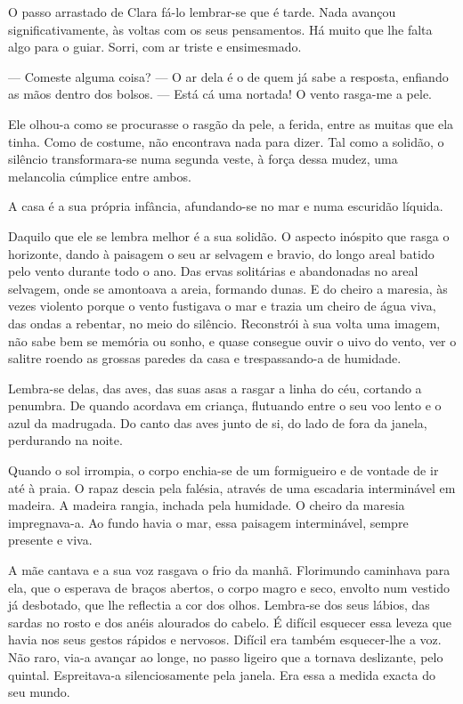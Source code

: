 O passo arrastado de Clara fá-lo lembrar-se que é tarde. Nada avançou
significativamente, às voltas com os seus pensamentos. Há muito que lhe
falta algo para o guiar. Sorri, com ar triste e ensimesmado.

--- Comeste alguma coisa? --- O ar dela é o de quem já sabe a resposta,
enfiando as mãos dentro dos bolsos. --- Está cá uma nortada! O vento
rasga-me a pele.

Ele olhou-a como se procurasse o rasgão da pele, a ferida, entre as
muitas que ela tinha. Como de costume, não encontrava nada para dizer.
Tal como a solidão, o silêncio transformara-se numa segunda veste, à
força dessa mudez, uma melancolia cúmplice entre ambos.

A casa é a sua própria infância, afundando-se no mar e numa escuridão
líquida.

Daquilo que ele se lembra melhor é a sua solidão. O aspecto inóspito que
rasga o horizonte, dando à paisagem o seu ar selvagem e bravio, do longo
areal batido pelo vento durante todo o ano. Das ervas solitárias e
abandonadas no areal selvagem, onde se amontoava a areia, formando
dunas. E do cheiro a maresia, às vezes violento porque o vento fustigava
o mar e trazia um cheiro de água viva, das ondas a rebentar, no meio do
silêncio. Reconstrói à sua volta uma imagem, não sabe bem se memória ou
sonho, e quase consegue ouvir o uivo do vento, ver o salitre roendo as
grossas paredes da casa e trespassando-a de humidade.

Lembra-se delas, das aves, das suas asas a rasgar a linha do céu,
cortando a penumbra. De quando acordava em criança, flutuando entre o
seu voo lento e o azul da madrugada. Do canto das aves junto de si, do
lado de fora da janela, perdurando na noite.

Quando o sol irrompia, o corpo enchia-se de um formigueiro e de vontade
de ir até à praia. O rapaz descia pela falésia, através de uma escadaria
interminável em madeira. A madeira rangia, inchada pela humidade. O
cheiro da maresia impregnava-a. Ao fundo havia o mar, essa paisagem
interminável, sempre presente e viva.

A mãe cantava e a sua voz rasgava o frio da manhã. Florimundo caminhava
para ela, que o esperava de braços abertos, o corpo magro e seco,
envolto num vestido já desbotado, que lhe reflectia a cor dos olhos.
Lembra-se dos seus lábios, das sardas no rosto e dos anéis alourados do
cabelo. É difícil esquecer essa leveza que havia nos seus gestos rápidos
e nervosos. Difícil era também esquecer-lhe a voz. Não raro, via-a
avançar ao longe, no passo ligeiro que a tornava deslizante, pelo
quintal. Espreitava-a silenciosamente pela janela. Era essa a medida
exacta do seu mundo.


